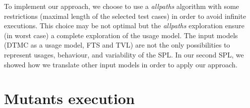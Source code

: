 
To implement our approach, we choose to use a \emph{allpaths} algorithm with some restrictions (maximal length of the selected test cases) in order to avoid infinite executions. This choice may be not optimal but the \emph{allpaths} exploration ensure (in worst case) a complete exploration of the usage model. The input models (DTMC as a usage model, FTS and TVL) are not the only possibilities to represent usages, behaviour, and variability of the SPL. In our second SPL, we showed how we translate other input models in order to apply our approach.

%



\section{Mutants execution}

\label{sec:experiment:fmmexec}

